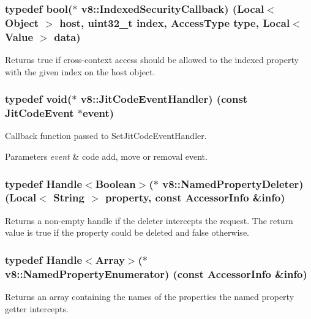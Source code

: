 \subsubsection[{Indexed\+Security\+Callback}]{\setlength{\rightskip}{0pt plus 5cm}typedef bool($\ast$ v8\+::\+Indexed\+Security\+Callback) ({\bf Local}$<$ {\bf Object} $>$ host, uint32\+\_\+t index, {\bf Access\+Type} type, {\bf Local}$<$ {\bf Value} $>$ data)}\label{namespacev8_aebbcc7837753e51112d944ad96520da1}
Returns true if cross-\/context access should be allowed to the indexed property with the given index on the host object. \hypertarget{namespacev8_a39243bc91e63d64d111452fdb98c4733}{}
\subsubsection[{Jit\+Code\+Event\+Handler}]{\setlength{\rightskip}{0pt plus 5cm}typedef void($\ast$ v8\+::\+Jit\+Code\+Event\+Handler) (const {\bf Jit\+Code\+Event} $\ast$event)}\label{namespacev8_a39243bc91e63d64d111452fdb98c4733}
Callback function passed to Set\+Jit\+Code\+Event\+Handler.


\begin{DoxyParams}{Parameters}
{\em event} & code add, move or removal event. \\
\hline
\end{DoxyParams}
\hypertarget{namespacev8_a7899471fae82b252750b81f41d5c1e26}{}
\subsubsection[{Named\+Property\+Deleter}]{\setlength{\rightskip}{0pt plus 5cm}typedef {\bf Handle}$<${\bf Boolean}$>$($\ast$ v8\+::\+Named\+Property\+Deleter) ({\bf Local}$<$ {\bf String} $>$ property, const {\bf Accessor\+Info} \&info)}\label{namespacev8_a7899471fae82b252750b81f41d5c1e26}
Returns a non-\/empty handle if the deleter intercepts the request. The return value is true if the property could be deleted and false otherwise. \hypertarget{namespacev8_acbd04b83708cb5a80e73e0396f176e58}{}
\subsubsection[{Named\+Property\+Enumerator}]{\setlength{\rightskip}{0pt plus 5cm}typedef {\bf Handle}$<${\bf Array}$>$($\ast$ v8\+::\+Named\+Property\+Enumerator) (const {\bf Accessor\+Info} \&info)}\label{namespacev8_acbd04b83708cb5a80e73e0396f176e58}
Returns an array containing the names of the properties the named property getter intercepts. \hypertarget{namespacev8_ab9effde41da1c073eddbd4a11a62bd0b}{}

